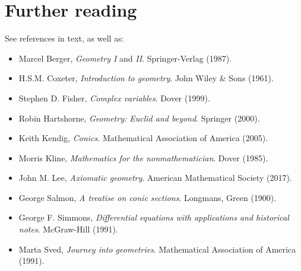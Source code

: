 \documentclass[a4paper,leqno,10pt]{article}
\theoremstyle{exercise}
\theoremstyle{plain}
\theoremstyle{definition}
\theoremstyle{remark}
\begin{document}
\section{Further reading}
See references in text, as well as:
\begin{itemize}
  \item Marcel Berger, \emph{Geometry I} and \emph{II}. Springer-Verlag (1987).
  \item H.S.M. Coxeter, \emph{Introduction to geometry}. John Wiley \& Sons (1961).
  \item Stephen D. Fisher, \emph{Complex variables}. Dover (1999).
  \item Robin Hartshorne, \emph{Geometry: Euclid and beyond}. Springer (2000).
  \item Keith Kendig, \emph{Conics}. Mathematical Association of America (2005).
  \item Morris Kline, \emph{Mathematics for the nonmathematician}. Dover (1985).
  \item John M. Lee, \emph{Axiomatic geometry}. American Mathematical Society (2017).
  \item George Salmon, \emph{A treatise on conic sections}. Longmans, Green (1900).
  \item George F. Simmons, \emph{Differential equations with applications and historical notes}. McGraw-Hill (1991).
  \item Marta Sved, \emph{Journey into geometries}. Mathematical Association of America (1991).
\end{itemize}
\end{document}
